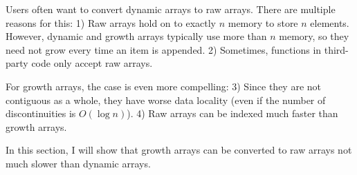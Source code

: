Users often want to convert dynamic arrays to raw arrays. There are multiple reasons for this: 1) Raw arrays hold on to exactly $n$ memory to store $n$ elements. However, dynamic and growth arrays typically use more than $n$ memory, so they need not grow every time an item is appended. 2) Sometimes, functions in third-party code only accept raw arrays.

For growth arrays, the case is even more compelling: 3) Since they are not contiguous as a whole, they have worse data locality (even if the number of discontinuities is $O(\log n)$). 4) Raw arrays can be indexed much faster than growth arrays.

In this section, I will show that growth arrays can be converted to raw arrays not much slower than dynamic arrays.